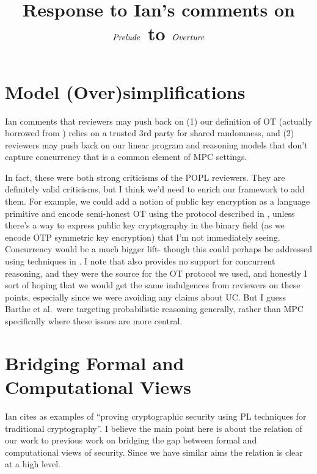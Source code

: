 \documentclass[acmsmall,screen,review]{acmart}
\begin{document}
\title{Response to Ian's comments on $\mathit{Prelude}$ to $\mathit{Overture}$}

\maketitle

\section{Model (Over)simplifications}

Ian comments that reviewers may push back on (1) our definition of OT
(actually borrowed from \cite{barthe2019probabilistic}) relies on a
trusted 3rd party for shared randomness, and (2) reviewers may push
back on our linear program and reasoning models that don't capture
concurrency that is a common element of MPC settings.

In fact, these were both strong criticisms of the POPL reviewers.
They are definitely valid criticisms, but I think we'd need to enrich
our framework to add them. For example, we could add a notion of
public key encryption as a language primitive and encode semi-honest
OT using the protocol described in \cite{evans2018pragmatic}, unless
there's a way to express public key cryptography in the binary field
(as we encode OTP symmetric key encryption) that I'm not immediately
seeing. Concurrency would be a much bigger lift- though this could
perhaps be addressed using techniques in \cite{MITCHELL2006118}.  I
note that \cite{barthe2019probabilistic} also provides no support for
concurrent reasoning, and they were the source for the OT protocol we
used, and honestly I sort of hoping that we would get the same
indulgences from reviewers on these points, especially since we were
avoiding any claims about UC. But I guess Barthe et al.~were targeting
probabilistic reasoning generally, rather than MPC specifically where
these issues are more central.

\section{Bridging Formal and Computational Views}

Ian cites \cite{10.1007/3-540-44929-9_1,MITCHELL2006118} as examples
of ``proving cryptographic security using PL techniques for
traditional cryptography''. I believe the main point here is about
the relation of our work to previous work on bridging the gap between
formal and computational views of security. Since we have similar
aims the relation is clear at a high level.
\end{document}
